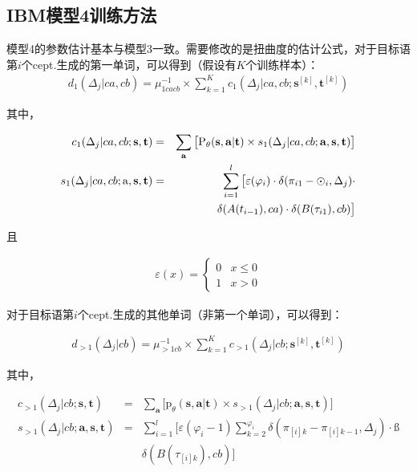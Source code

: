 \begin{appendices}
\section{IBM模型4训练方法}

\parinterval 模型4的参数估计基本与模型3一致。需要修改的是扭曲度的估计公式，对于目标语第$i$个cept.生成的第一单词，可以得到（假设有$K$个训练样本）：
\begin{eqnarray}
d_1(\Delta_j|ca,cb) = \mu_{1cacb}^{-1} \times \sum_{k=1}^{K}c_1(\Delta_j|ca,cb;\mathbf{s}^{[k]},\mathbf{t}^{[k]})
\label{eq:1.15}
\end{eqnarray}

其中，

\begin{eqnarray}
c_1(\Delta_j|ca,cb;\mathbf{s},\mathbf{t})           & = & \sum_{\mathbf{a}}\big[\textrm{P}_{\theta}(\mathbf{s},\mathbf{a}|\mathbf{t}) \times s_1(\Delta_j|ca,cb;\mathbf{a},\mathbf{s},\mathbf{t})\big] \label{eq:1.16} \\
s_1(\Delta_j|ca,cb;\rm{a},\mathbf{s},\mathbf{t}) & = & \sum_{i=1}^l \big[\varepsilon(\varphi_i) \cdot \delta(\pi_{i1}-\odot _{i},\Delta_j) \cdot \nonumber \\
                                                                           &     & \delta(A(t_{i-1}),ca) \cdot \delta(B(\tau_{i1}),cb) \big] \label{eq:1.17}
\end{eqnarray}

且

\begin{eqnarray}
\varepsilon(x) = \begin{cases}
0 & x \leq 0 \\
1 & x > 0
\end{cases}
\label{eq:1.21}
\end{eqnarray}

对于目标语第$i$个cept.生成的其他单词（非第一个单词），可以得到：

\begin{eqnarray}
d_{>1}(\Delta_j|cb) = \mu_{>1cb}^{-1} \times \sum_{k=1}^{K}c_{>1}(\Delta_j|cb;\mathbf{s}^{[k]},\mathbf{t}^{[k]})
\label{eq:1.18}
\end{eqnarray}

其中，

\begin{eqnarray}
c_{>1}(\Delta_j|cb;\mathbf{s},\mathbf{t})                  & = & \sum_{\mathbf{a}}\big[\textrm{p}_{\theta}(\mathbf{s},\mathbf{a}|\mathbf{t}) \times s_{>1}(\Delta_j|cb;\mathbf{a},\mathbf{s},\mathbf{t}) \big] \label{eq:1.19} \\
s_{>1}(\Delta_j|cb;\mathbf{a},\mathbf{s},\mathbf{t}) & = & \sum_{i=1}^l \big[\varepsilon(\varphi_i-1)\sum_{k=2}^{\varphi_i}\delta(\pi_{[i]k}-\pi_{[i]k-1},\Delta_j) \cdot \nonumber ß\\
                                                                                  &    & \delta(B(\tau_{[i]k}),cb) \big] \label{eq:1.20}
\end{eqnarray}


\end{appendices}
